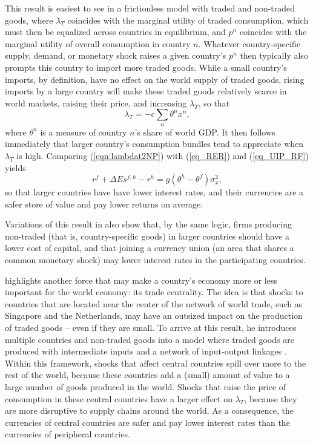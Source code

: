 \documentclass{ar-1col}
\begin{document}
This result is easiest to see in a frictionless model with traded and non-traded goods, where $\lambda_T$ coincides with the marginal utility of traded consumption, which must then be equalized across countries in equilibrium, and $p^n$ coincides with the marginal utility of overall consumption in country $n$. Whatever country-specific supply, demand, or monetary shock raises a given country's $p^n$ then typically also prompts this country to import more traded goods. While a small country's imports, by definition, have no effect on the world supply of traded goods, rising imports by a large country will make these traded goods relatively scarce in world markets, raising their price, and increasing $\lambda_T$, so that
\begin{equation} \lambda_{T} = -c \sum_{n} \theta^n x^n,
    \label{eqn:lambdat2NP}
\end{equation}
where $\theta^n$ is a measure of country $n$'s share of world GDP. It then follows immediately that larger country's consumption bundles tend to appreciate when $\lambda_T$ is high. Comparing (\ref{eqn:lambdat2NP}) with (\ref{eq_RER}) and (\ref{eq_UIP_RF}) yields
\begin{equation}
  r^{f} + \Delta E s^{f, h} - r^{h}
  =g\left(\theta^h - \theta^f\right) \sigma_x^2,
  \label{eq_FF_UIP}
\end{equation}
so that larger countries have have lower interest rates, and their currencies are a safer store of value and pay lower returns on average.
  
Variations of this result in \citet{Hassan2013} also show that, by the same logic, firms producing non-traded (that is, country-specific goods) in larger countries should have a lower cost of capital, and that joining a currency union (an area that shares a common monetary shock) may lower interest rates in the participating countries.

\citet{Richmond2019} highlights another force that may make a country's economy more or less important for the world economy: its trade centrality. The idea is that shocks to countries that are located near the center of the network of world trade, such as Singapore and the Netherlands, may have an outsized impact on the production of traded goods -- even if they are small. To arrive at this result, he introduces multiple countries and non-traded goods into a model where traded goods are produced with intermediate inputs and a network of input-output linkages \citep{LongPlosser1983, Acemogluetal2012}. Within this framework, shocks that affect central countries spill over more to the rest of the world, because these countries add a (small) amount of value to a large number of goods produced in the world. Shocks that raise the price of consumption in these central countries have a larger effect on  $\lambda_T$, because they are more disruptive to supply chains around the world. As a consequence, the currencies of central countries are safer and pay lower interest rates than the currencies of peripheral countries.   
\end{document}
